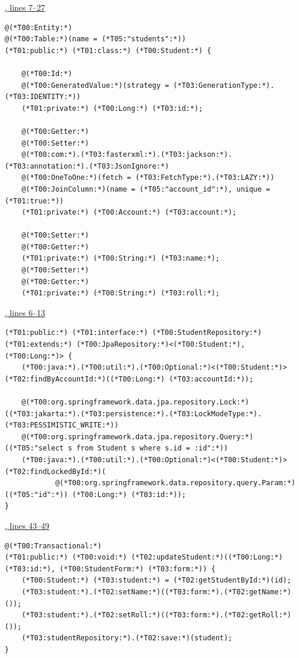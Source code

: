 \par\smallskip
{\small\href{\repo/blob/5d22aed7f6d4ef1e4c0b0c0dabf2962ba4b47608/src/main/java/com/example/fmschool/entity/Student.java#L7-L27}{, lines 7--27}}
\begin{lstlisting}[style=vsJava,firstnumber=7]
@(*T00:Entity:*)
@(*T00:Table:*)(name = (*T05:"students":*))
(*T01:public:*) (*T01:class:*) (*T00:Student:*) {

    @(*T00:Id:*)
    @(*T00:GeneratedValue:*)(strategy = (*T03:GenerationType:*).(*T03:IDENTITY:*))
    (*T01:private:*) (*T00:Long:*) (*T03:id:*);

    @(*T00:Getter:*)
    @(*T00:Setter:*)
    @(*T00:com:*).(*T03:fasterxml:*).(*T03:jackson:*).(*T03:annotation:*).(*T03:JsonIgnore:*)
    @(*T00:OneToOne:*)(fetch = (*T03:FetchType:*).(*T03:LAZY:*))
    @(*T00:JoinColumn:*)(name = (*T05:"account_id":*), unique = (*T01:true:*))
    (*T01:private:*) (*T00:Account:*) (*T03:account:*);

    @(*T00:Setter:*)
    @(*T00:Getter:*)
    (*T01:private:*) (*T00:String:*) (*T03:name:*);
    @(*T00:Setter:*)
    @(*T00:Getter:*)
    (*T01:private:*) (*T00:String:*) (*T03:roll:*);
\end{lstlisting}

\par\smallskip
{\small\href{\repo/blob/5d22aed7f6d4ef1e4c0b0c0dabf2962ba4b47608/src/main/java/com/example/fmschool/repository/StudentRepository.java#L6-L13}{, lines 6--13}}
\begin{lstlisting}[style=vsJava,firstnumber=6]
(*T01:public:*) (*T01:interface:*) (*T00:StudentRepository:*) (*T01:extends:*) (*T00:JpaRepository:*)<(*T00:Student:*), (*T00:Long:*)> {
    (*T00:java:*).(*T00:util:*).(*T00:Optional:*)<(*T00:Student:*)> (*T02:findByAccountId:*)((*T00:Long:*) (*T03:accountId:*));

    @(*T00:org.springframework.data.jpa.repository.Lock:*)((*T03:jakarta:*).(*T03:persistence:*).(*T03:LockModeType:*).(*T03:PESSIMISTIC_WRITE:*))
    @(*T00:org.springframework.data.jpa.repository.Query:*)((*T05:"select s from Student s where s.id = :id":*))
    (*T00:java:*).(*T00:util:*).(*T00:Optional:*)<(*T00:Student:*)> (*T02:findLockedById:*)(
            @(*T00:org.springframework.data.repository.query.Param:*)((*T05:"id":*)) (*T00:Long:*) (*T03:id:*));
}
\end{lstlisting}

\par\smallskip
{\small\href{\repo/blob/5d22aed7f6d4ef1e4c0b0c0dabf2962ba4b47608/src/main/java/com/example/fmschool/service/StudentService.java#L43-L49}{, lines 43--49}}
\begin{lstlisting}[style=vsJava,firstnumber=43]
@(*T00:Transactional:*)
(*T01:public:*) (*T00:void:*) (*T02:updateStudent:*)((*T00:Long:*) (*T03:id:*), (*T00:StudentForm:*) (*T03:form:*)) {
    (*T00:Student:*) (*T03:student:*) = (*T02:getStudentById:*)(id);
    (*T03:student:*).(*T02:setName:*)((*T03:form:*).(*T02:getName:*)());
    (*T03:student:*).(*T02:setRoll:*)((*T03:form:*).(*T02:getRoll:*)());
    (*T03:studentRepository:*).(*T02:save:*)(student);
}
\end{lstlisting}


